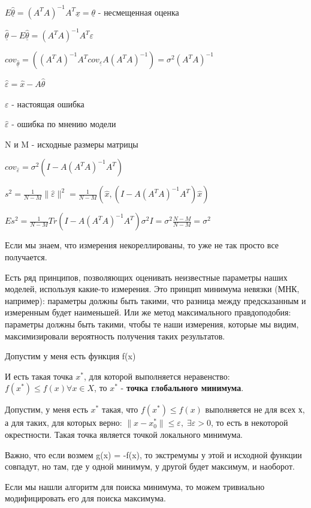 \documentclass[a4paper, 12pt]{article}
\renewcommand{\epsilon}{\varepsilon}
\begin{document}
	$E\hat{\underline{\theta}} = (A^TA)^{-1} A^T{\underline{x}} = \underline{\theta} $ - несмещенная оценка
	
	$\hat{\underline{\theta}} - E\hat{\underline{\theta}} = (A^TA)^{-1} A^T\epsilon$
	
	$cov_{\hat{\underline{\theta}}} = ((A^TA)^{-1} A^T cov_{\underline{\epsilon}} A(A^TA)^{-1}) = \sigma^2 (A^TA)^{-1}$
	
	$\hat{\epsilon} = \hat{x} - A \hat{\theta}$
	
	$\epsilon$ - настоящая ошибка
	
	$\hat{\epsilon}$ - ошибка по мнению модели
	
	N и M - исходные размеры матрицы
	
	$cov_{\hat{\epsilon}} = \sigma^2(I - A(A^TA)^{-1}A^T)$
	
	$s^2 = \frac{1}{N-M}\|\hat{\epsilon}\|^2 =\frac{1}{N-M}(\hat{x}, (I - A(A^TA)^{-1}A^T)\hat{x})$
	
	$Es^2 = \frac{1}{N-M}Tr(I - A(A^TA)^{-1}A^T)\sigma^2 I = \sigma^2\frac{N-M}{N-M} = \sigma^2$
	
	Если мы знаем, что измерения некореллированы, то уже не так просто все получается.
	
	Есть ряд принципов, позволяющих оценивать неизвестные параметры наших моделей, используя какие-то измерения. Это принцип минимума невязки (МНК, например): параметры должны быть такими, что разница между предсказанным и измеренным будет наименьшей. Или же метод максимального правдоподобия: параметры должны быть такими, чтобы те наши измерения, которые мы видим, максимизировали вероятность получения таких результатов. 
	
	
	Допустим у меня есть функция f(x)
	
	И есть такая точка $x^*$, для которой выполняется неравенство: $f(x^*) \leq f(x) \forall x \in X$, то $x^*$ - \textbf{точка глобального минимума}.
	
	Допустим, у меня есть $x^*$ такая, что $f(x^*) \leq f(x)$ выполняется не для всех х, а для таких, для которых верно: $\|x-x_0^*\|\leq \epsilon , \; \exists \epsilon >0 $, то есть в некоторой окрестности. Такая точка является точкой локального минимума. 
	
	Важно, что если возмем g(x) = -f(x), то экстремумы у этой и исходной функции совпадут, но там, где у одной минимум, у другой будет максимум, и наоборот. 
	
	Если мы нашли алгоритм для поиска минимума, то можем тривиально модифицировать его для поиска максимума. 
	
\end{document}
